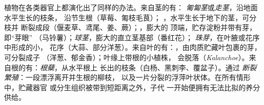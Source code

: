 \begin{proposition}[营养增殖的器官]\label{prop:b2:asexual-reproduction:organs}
植物在各类器官上都演化出了同样的办法。来自茎的有：
\emph{匍匐茎}或\emph{走茎}，沿地面水平生长的枝条，
沿节生根（草莓、匍枝毛茛）；
\emph{}，水平生长于地下的茎，可分枝并
断裂成段（偃麦草、鸢尾、姜、蕨）；\emph{}，膨大的
顶端，贮存淀粉并带有芽，即“芽眼”
（马铃薯）；\emph{球茎}，膨大的直立茎基部（番红花）；
\emph{珠芽}，在叶腋或花序中形成的小，
花序（大蒜、部分洋葱）。来自叶的有：\emph{}，由肉质贮藏叶包裹的芽，
可分裂成子
（洋葱、郁金香）；叶缘上带根的小植株，
会脱落（\emph{Kalanchoe}）。来自根的有：\emph{根蘖}，从水平根上
长出的枝条（白杨、黑刺李、覆盆子）。通过
\emph{断裂繁殖}：一段漂浮离开并生根的柳枝，
以及一片分裂的浮萍叶状体。在所有情形中，贮藏器官
或分生组织被带到短距离之外，子代
一开始便拥有无法比拟的养分供给。
\end{proposition}

